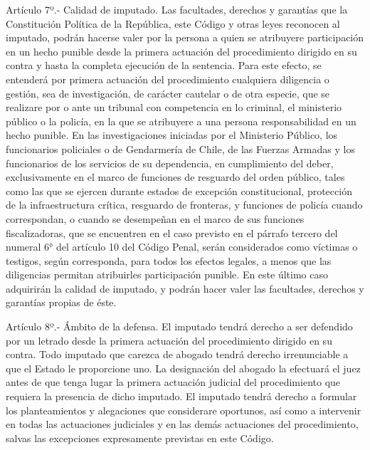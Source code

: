     Artículo 7º.- Calidad de imputado. Las facultades, derechos y garantías que la Constitución Política de la República, este Código y otras leyes reconocen al imputado, podrán hacerse valer por la persona a quien se atribuyere participación en un hecho punible desde la primera actuación del procedimiento dirigido en su contra y hasta la completa ejecución de la sentencia.
    Para este efecto, se entenderá por primera actuación del procedimiento cualquiera diligencia o gestión, sea de investigación, de carácter cautelar o de otra especie, que se realizare por o ante un tribunal con competencia en lo criminal, el ministerio público o la policía, en la que se atribuyere a una persona responsabilidad en un hecho punible.
    En las investigaciones iniciadas por el Ministerio Público, los funcionarios policiales o de Gendarmería de Chile, de las Fuerzas Armadas y los funcionarios de los servicios de su dependencia, en cumplimiento del deber, exclusivamente en el marco de funciones de resguardo del orden público, tales como las que se ejercen durante estados de excepción constitucional, protección de la infraestructura crítica, resguardo de fronteras, y funciones de policía cuando correspondan, o cuando se desempeñan en el marco de sus funciones fiscalizadoras, que se encuentren en el caso previsto en el párrafo tercero del numeral 6° del artículo 10 del Código Penal, serán considerados como víctimas o testigos, según corresponda, para todos los efectos legales, a menos que las diligencias permitan atribuirles participación punible. En este último caso adquirirán la calidad de imputado, y podrán hacer valer las facultades, derechos y garantías propias de éste.

    Artículo 8º.- Ámbito de la defensa. El imputado tendrá derecho a ser defendido por un letrado desde la primera actuación del procedimiento dirigido en su contra. Todo imputado que carezca de abogado tendrá derecho irrenunciable a que el Estado le proporcione uno. La designación del abogado la efectuará el juez antes de que tenga lugar la primera actuación judicial del procedimiento que requiera la presencia de dicho imputado.
    El imputado tendrá derecho a formular los planteamientos y alegaciones que considerare oportunos, así como a intervenir en todas las actuaciones judiciales y en las demás actuaciones del procedimiento, salvas las excepciones expresamente previstas en este Código.

